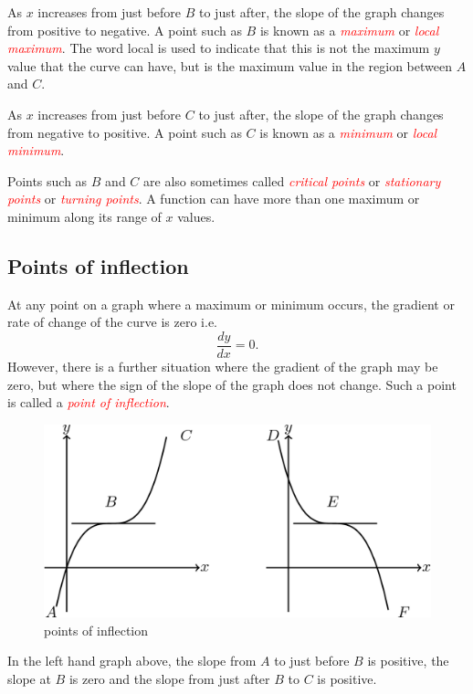 \documentclass[
  11pt,
  oneside]{book}
\newcommand{\slide}{}
\theoremstyle{definition}
\theoremstyle{definition}
\theoremstyle{definition}
\theoremstyle{definition}
\theoremstyle{remark}
\begin{document}
As \(x\) increases from just before \(B\) to just after, the slope of the graph changes from positive to negative. A point such as \(B\) is known as a \textcolor{red}{\em maximum} or \textcolor{red}{\em local maximum}. The word local is used to indicate that this is not the maximum \(y\) value that the curve can have, but is the maximum value in the region between \(A\) and \(C\).

As \(x\) increases from just before \(C\) to just after, the slope of the graph changes from negative to positive. A point such as \(C\) is known as a \textcolor{red}{\em minimum} or \textcolor{red}{\em local minimum}.

Points such as \(B\) and \(C\) are also sometimes called \textcolor{red}{\em critical points} or \textcolor{red}{\em stationary points} or \textcolor{red}{\em turning points}. A function can have more than one maximum or minimum along its range of \(x\) values.
\slide

\subsection{Points of inflection}\label{points-of-inflection}

At any point on a graph where a maximum or minimum occurs, the gradient or rate of change of the curve is zero i.e.
\[
\frac{dy}{dx}=0.
\]
However, there is a further situation where the gradient of the graph may be zero, but where the sign of the slope of the graph does not change. Such a point is called a \textcolor{red}{\em point of inflection}.

\begin{figure}

{\centering \includegraphics[width=0.5\linewidth]{tikztopng-figure7} 

}

\caption{points of inflection}\label{fig:inflection}
\end{figure}

In the left hand graph above, the slope from \(A\) to just before \(B\) is positive, the slope at \(B\) is zero and the slope from just after \(B\) to \(C\) is positive.
\end{document}
